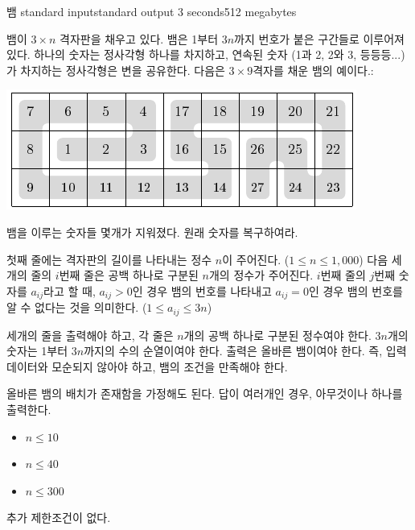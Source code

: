 \begin{problem}{뱀}
	{standard input}{standard output}
	{3 seconds}{512 megabytes}{}
	
	뱀이 $3 \times n$ 격자판을 채우고 있다. 뱀은 1부터 $3n$까지 번호가 붙은 구간들로 이루어져 있다. 하나의 숫자는 정사각형 하나를 차지하고, 연속된 숫자 (1과 2, 2와 3, 등등등...)가 차지하는 정사각형은 변을 공유한다. 다음은 $3 \times 9$격자를 채운 뱀의 예이다.: 
	
	\begin{center}
	\includegraphics[]{waz.png}
	\end{center}

	뱀을 이루는 숫자들 몇개가 지워졌다. 원래 숫자를 복구하여라.
	
	\InputFile
	
	첫째 줄에는 격자판의 길이를 나타내는 정수 $n$이 주어진다. ($1 \le n \le 1,000$) 다음 세개의 줄의 $i$번째 줄은 공백 하나로 구분된 $n$개의 정수가 주어진다. $i$번째 줄의 $j$번째 숫자를 $a_{ij}$라고 할 때, $a_{ij}>0$인 경우 뱀의 번호를 나타내고 $a_{ij}=0$인 경우 뱀의 번호를 알 수 없다는 것을 의미한다. ($1 \le a_{ij} \le 3n$)
	
	\OutputFile
	
	세개의 줄을 출력해야 하고, 각 줄은 $n$개의 공백 하나로 구분된 정수여야 한다. $3n$개의 숫자는 1부터 $3n$까지의 수의 순열이여야 한다. 출력은 올바른 뱀이여야 한다. 즉, 입력 데이터와 모순되지 않아야 하고, 뱀의 조건을 만족해야 한다.
	
	올바른 뱀의 배치가 존재함을 가정해도 된다. 답이 여러개인 경우, 아무것이나 하나를 출력한다.
	
	
	\begin{itemize}
		\item $n \le 10$
	\end{itemize}
	
	\begin{itemize}
		\item $n \le 40$
	\end{itemize}
	
	
	\begin{itemize}
		\item $n \le 300$
	\end{itemize}
	
	
	추가 제한조건이 없다.
	
	\Examples
		
	\begin{example}
	\end{example}
	
	
	
	
	
\end{problem}

